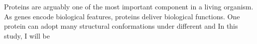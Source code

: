 Proteins are arguably one of the most important component in a living organism. As genes encode biological features, proteins deliver biological functions. One protein can adopt many structural conformations under different and   In this study, I will be 